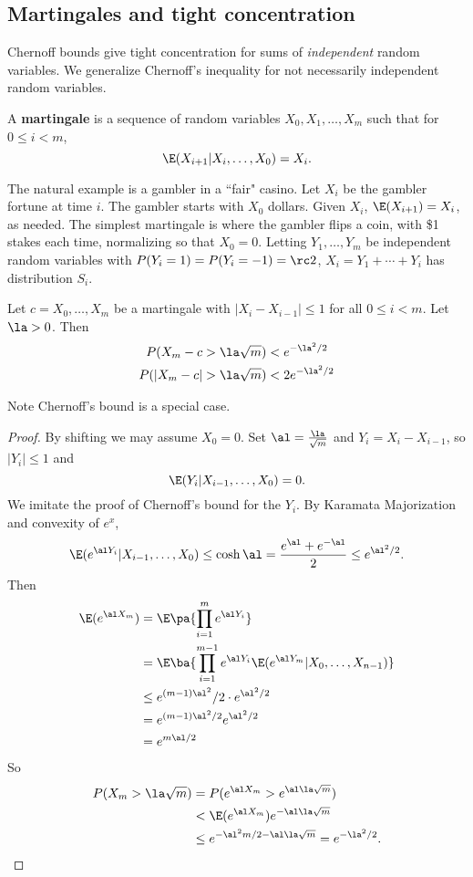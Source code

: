 
\subsection{Martingales and tight concentration}
Chernoff bounds give tight concentration for sums of {\it independent} random variables. We generalize Chernoff's inequality for not necessarily independent random variables.
\begin{df}
A \textbf{martingale} is a sequence of random variables $X_0,X_1,\ldots, X_m$ such that for $0\le i<m$, 
\[
\E(X_{i+1}|X_i,\ldots, X_0)=X_i.
\]
\end{df}
The natural example is a gambler in a ``fair" casino. Let $X_i$ be the gambler fortune at time $i$. The gambler starts with $X_0$ dollars. Given $X_i$, $\E(X_{i+1})=X_i$, as needed. The simplest martingale is where the gambler flips a coin, with \$1 stakes each time, normalizing so that $X_0=0$. Letting $Y_1,\ldots, Y_m$ be independent random variables with $P(Y_i=1)=P(Y_i=-1)=\rc2$, $X_i=Y_1+\cdots +Y_i$ has distribution $S_i$.

\begin{thm}\label{azuma}
Let $c=X_0,\ldots, X_m$ be a martingale with $|X_i-X_{i-1}|\le 1$ for all $0\le i<m$. Let $\la>0$. Then 
\begin{align*}
P(X_m-c>\la \sqrt m)&<e^{-\la^2/2}\\
P(|X_m-c|>\la \sqrt m)&<2e^{-\la^2/2}
\end{align*}
\end{thm}
Note Chernoff's bound is a special case.
\begin{proof}
By shifting we may assume $X_0=0$. 
Set $\al=\frac{\la}{\sqrt m}$ and $Y_i=X_i-X_{i-1}$, so $|Y_i|\le 1$ and
\[
\E(Y_i|X_{i-1},\ldots, X_0)=0.
\]
We imitate the proof of Chernoff's bound for the $Y_i$. By Karamata Majorization and convexity of $e^x$,
\[
\E(e^{\al Y_i}|X_{i-1},\ldots, X_0)\le \cosh \al =\frac{e^{\al}+e^{-\al}}{2}\le e^{\al^2/2}.
\]
Then
\begin{align*}
\E(e^{\al X_m})&=\E\pa{\prod_{i=1}^m e^{\al Y_i}}\\
&=\E\ba{\prod_{i=1}^{m-1} e^{\al Y_i} \E(e^{\al Y_m}|X_0,\ldots , X_{n-1})}\\
&\le e^{(m-1)\al^2}/2\cdot e^{\al^2/2}\\
&=e^{(m-1)\al^2/2}e^{\al^2/2}\\
&=e^{m\al /2}
\end{align*}
So
\begin{align*}
P(X_m>\la\sqrt m)&=P(e^{\al X_m}>e^{\al \la \sqrt m})\\
&<\E(e^{\al X_m}) e^{-\al \la \sqrt m}\\
&\le e^{-\al^2m/2-\al \la \sqrt m}=e^{-\la^2/2}.
\end{align*}
\end{proof}
